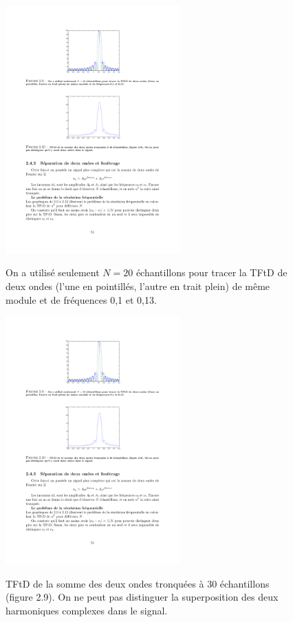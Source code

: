 \begin{figure}
  \centering
  \includegraphics[width=0.6\textwidth]{Figures/Figure2-9}\\
  \caption{On a utilis\'{e} seulement $N=20$ \'{e}chantillons pour tracer la TFtD de deux ondes (l'une en pointill\'{e}s, l'autre en trait plein) de m\^{e}me module et de fr\'{e}quences 0,1 et 0,13.}\label{fig:figure2-9}
\end{figure}

\begin{figure}
  \centering
  \includegraphics[width=0.6\textwidth]{Figures/Figure2-10}\\
  \caption{TFtD de la somme des deux ondes tronqu\'{e}es \`{a} 30 \'{e}chantillons (figure 2.9). On ne peut pas distinguer la superposition des deux harmoniques complexes dans le signal.}\label{fig:figure2-10}
\end{figure}


